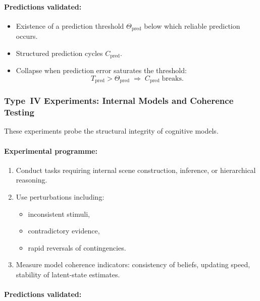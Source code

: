 \paragraph{Predictions validated:}

\begin{itemize}
    \item Existence of a prediction threshold 
          $\Theta_{\mathrm{pred}}$ below which reliable prediction occurs.
    \item Structured prediction cycles $C_{\mathrm{pred}}$.
    \item Collapse when prediction error saturates the threshold:
          \[
             T_{\mathrm{pred}} > \Theta_{\mathrm{pred}}
             \;\Rightarrow\; C_{\mathrm{pred}} \;\text{breaks}.
          \]
\end{itemize}



\subsubsection{Type~IV Experiments: Internal Models and Coherence Testing}

These experiments probe the structural integrity of
cognitive models.

\paragraph{Experimental programme:}

\begin{enumerate}
    \item Conduct tasks requiring internal scene construction,
          inference, or hierarchical reasoning.
    \item Use perturbations including:
          \begin{itemize}
              \item inconsistent stimuli,
              \item contradictory evidence,
              \item rapid reversals of contingencies.
          \end{itemize}
    \item Measure model coherence indicators:
          consistency of beliefs, updating speed, stability of
          latent-state estimates.
\end{enumerate}

\paragraph{Predictions validated:}

